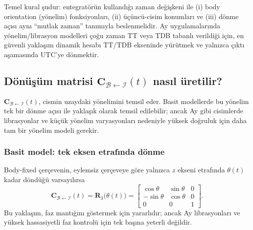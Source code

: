 Temel kural şudur: entegratörün kullandığı zaman değişkeni ile (i) body orientation (yönelim) fonksiyonları,
(ii) üçüncü-cisim konumları ve (iii) dönme açısı aynı ``mutlak zaman'' tanımıyla beslenmelidir.
Ay uygulamalarında yönelim/librasyon modelleri çoğu zaman TT veya TDB tabanlı verildiği için,
en güvenli yaklaşım dinamik hesabı TT/TDB ekseninde yürütmek ve yalnızca çıktı aşamasında UTC'ye dönmektir.

\subsection{Dönüşüm matrisi $\mathbf C_{\mathcal B\leftarrow\mathcal I}(t)$ nasıl üretilir?}
\label{subsec:how_to_get_C}

$\mathbf C_{\mathcal B\leftarrow\mathcal I}(t)$, cismin uzaydaki yönelimini temsil eder. Basit modellerde bu yönelim
tek bir dönme açısı ile yaklaşık olarak temsil edilebilir; ancak Ay gibi cisimlerde librasyonlar ve küçük yönelim
varyasyonları nedeniyle yüksek doğruluk için daha tam bir yönelim modeli gerekir.

\subsubsection{Basit model: tek eksen etrafında dönme }
Body-fixed çerçevenin, eylemsiz çerçeveye göre yalnızca $z$ ekseni etrafında $\theta(t)$ kadar döndüğü varsayılırsa
\begin{equation}
\label{eq:R3_theta_simple}
\mathbf C_{\mathcal B\leftarrow\mathcal I}(t)=\mathbf R_3\!\big(\theta(t)\big)=
\begin{bmatrix}
\cos\theta & \sin\theta & 0\\
-\sin\theta & \cos\theta & 0\\
0 & 0 & 1
\end{bmatrix}.
\end{equation}
Bu yaklaşım, faz mantığını göstermek için yararlıdır; ancak Ay librasyonları ve yüksek hassasiyetli faz kontrolü için tek başına yeterli değildir.

